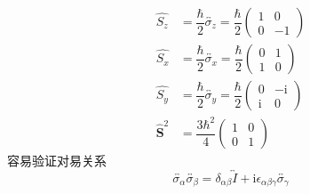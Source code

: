 \documentclass[12pt, a4paper, oneside]{ctexart}
\begin{document}
	\begin{align}
		\hat{S_{z}}&=\dfrac{\hbar}{2}\overleftrightarrow{\sigma_{z}}=\dfrac{\hbar}{2}\begin{pmatrix}
		1	& 0\\
		0	&-1
		\end{pmatrix}\\
		\hat{S_{x}}&=\dfrac{\hbar}{2}\overleftrightarrow{\sigma_{x}}=\dfrac{\hbar}{2}\begin{pmatrix}
			0	& 1\\
			1	& 0
		\end{pmatrix}\\
		\hat{S_{y}}&=\dfrac{\hbar}{2}\overleftrightarrow{\sigma_{y}}=\dfrac{\hbar}{2}\begin{pmatrix}
		0	& -\mathrm{i}\\
		\mathrm{i}	& 0
		\end{pmatrix}\\
		\boldsymbol{\hat{S}}^{2}&=\dfrac{3\hbar^{2}}{4}\begin{pmatrix}
			1	& 0\\
			0	&1
		\end{pmatrix}
	\end{align}
	\quad\quad 容易验证对易关系
	\begin{equation}
		\overleftrightarrow{\sigma_{\alpha}}\overleftrightarrow{\sigma_{\beta}}=\delta_{\alpha\beta}\overleftrightarrow{I}+\mathrm{i}\epsilon_{\alpha\beta\gamma}\overleftrightarrow{\sigma_{\gamma}}
	\end{equation}
\end{document}
